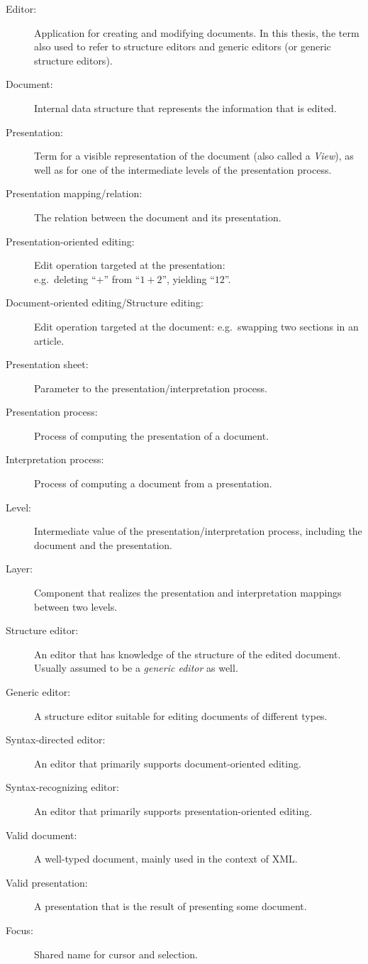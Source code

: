 \begin{description}
\item[Editor:] Application for creating and modifying documents. In this thesis, the term also used to refer to structure editors and generic editors (or generic structure editors).
\item[Document:] Internal data structure that represents the information that is edited.
\item[Presentation:] Term for a visible representation of the document (also called a {\em View}), as well as for one of the intermediate levels of the presentation process. 
\item[Presentation mapping/relation:] The relation between the document and its presentation.
\item[Presentation-oriented editing:] Edit operation targeted at the presentation:\\ e.g.\ deleting ``\;$+$\;'' from ``$1+2$'', yielding ``$12$''.
\item[Document-oriented editing/Structure editing:] Edit operation targeted at the document: e.g.\ swapping two sections in an article.
\item[Presentation sheet:] Parameter to the presentation/interpretation process. 
\item[Presentation process:] Process of computing the presentation of a document.
\item[Interpretation process:] Process of computing a document from a presentation.
\item[Level:] Intermediate value of the presentation/interpretation process, including the document and the presentation.
\item[Layer:] Component that realizes the presentation and interpretation mappings between two levels.
\item[Structure editor:] An editor that has knowledge of the structure of the edited document. Usually assumed to be a {\em generic editor} as well.
\item[Generic editor:] A structure editor suitable for editing documents of different types.
\item[Syntax-directed editor:] An editor that primarily supports document-oriented editing.
\item[Syntax-recognizing editor:] An editor that primarily supports presentation-oriented editing.
\item[Valid document:] A well-typed document, mainly used in the context of XML.
\item[Valid presentation:] A presentation that is the result of presenting some document.
\item[Focus:] Shared name for cursor and selection.
\end{description} 

